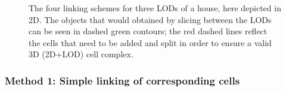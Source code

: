 \begin{figure}[tb]
\begin{center}
 \quad
  \end{center}
  \caption[Four linking schemes]{The four linking schemes for three LODs of a house, here depicted in 2D. The objects that would obtained by slicing between the LODs can be seen in dashed green contours; the red dashed lines reflect the cells that need to be added and split in order to ensure a valid 3D (2D+LOD) cell complex.}
\label{fig:linkingschemes}
\end{figure}


\subsubsection{Method 1: Simple linking of corresponding cells}
\label{sss:method1}

